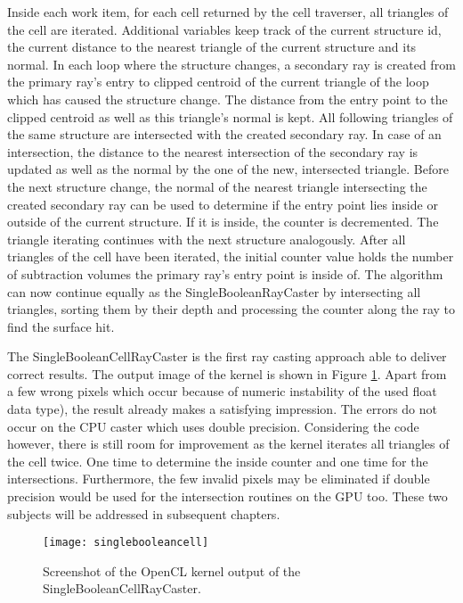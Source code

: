 Inside each work item, for each cell returned by the cell traverser, all triangles of the cell are iterated. Additional variables keep track of the current structure id, the current distance to the nearest triangle of the current structure and its normal. In each loop where the structure changes, a secondary ray is created from the primary ray's entry to clipped centroid of the current triangle of the loop which has caused the structure change. The distance from the entry point to the clipped centroid as well as this triangle's normal is kept. All following triangles of the same structure are intersected with the created secondary ray. In case of an intersection, the distance to the nearest intersection of the secondary ray is updated as well as the normal by the one of the new, intersected triangle. Before the next structure change, the normal of the nearest triangle intersecting the created secondary ray can be used to determine if the entry point lies inside or outside of the current structure. If it is inside, the counter is decremented. The triangle iterating continues with the next structure analogously. After all triangles of the cell have been iterated, the initial counter value holds the number of subtraction volumes the primary ray's entry point is inside of. The algorithm can now continue equally as the SingleBooleanRayCaster by intersecting all triangles, sorting them by their depth and processing the counter along the ray to find the surface hit.

The SingleBooleanCellRayCaster is the first ray casting approach able to deliver correct results. The output image of the kernel is shown in Figure \ref{fig:singlebooleancell}. Apart from a few wrong pixels which occur because of numeric instability of the used float data type), the result already makes a satisfying impression. The errors do not occur on the CPU caster which uses double precision. Considering the code however, there is still room for improvement as the kernel iterates all triangles of the cell twice. One time to determine the inside counter and one time for the intersections. Furthermore, the few invalid pixels may be eliminated if double precision would be used for the intersection routines on the GPU too. These two subjects will be addressed in subsequent chapters.

\begin{figure}[h]
\centering
\texttt{[image: singlebooleancell]}
\caption{Screenshot of the OpenCL kernel output of the SingleBooleanCellRayCaster.}
\label{fig:singlebooleancell}
\end{figure}

